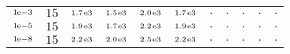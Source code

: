 \begin{tiny}
\begin{tabular}{@{$\;$}c@{$\;$}|@{$\;$}c@{$\;$}@{$\;$}c@{$\;$}@{$\;$}c@{$\;$}@{$\;$}c@{$\;$}@{$\;$}c@{$\;$}|@{$\;$}c@{$\;$}@{$\;$}c@{$\;$}@{$\;$}c@{$\;$}@{$\;$}c@{$\;$}@{$\;$}c@{$\;$}}
$\scriptstyle1\!\mathrm{\hspace{0.10em}e}-3$ & $\scriptstyle15$ & $\scriptstyle1.7\mathrm{\hspace{0.10em}e}3$ & $\scriptstyle1.5\mathrm{\hspace{0.10em}e}3$ & $\scriptstyle2.0\mathrm{\hspace{0.10em}e}3$ & $\scriptstyle1.7\mathrm{\hspace{0.10em}e}3$ & $\scriptstyle.$ & $\scriptstyle.$ & $\scriptstyle.$ & $\scriptstyle.$ & $\scriptstyle.$\\ 
$\scriptstyle1\!\mathrm{\hspace{0.10em}e}-5$ & $\scriptstyle15$ & $\scriptstyle1.9\mathrm{\hspace{0.10em}e}3$ & $\scriptstyle1.7\mathrm{\hspace{0.10em}e}3$ & $\scriptstyle2.2\mathrm{\hspace{0.10em}e}3$ & $\scriptstyle1.9\mathrm{\hspace{0.10em}e}3$ & $\scriptstyle.$ & $\scriptstyle.$ & $\scriptstyle.$ & $\scriptstyle.$ & $\scriptstyle.$\\ 
$\scriptstyle1\!\mathrm{\hspace{0.10em}e}-8$ & $\scriptstyle15$ & $\scriptstyle2.2\mathrm{\hspace{0.10em}e}3$ & $\scriptstyle2.0\mathrm{\hspace{0.10em}e}3$ & $\scriptstyle2.5\mathrm{\hspace{0.10em}e}3$ & $\scriptstyle2.2\mathrm{\hspace{0.10em}e}3$ & $\scriptstyle.$ & $\scriptstyle.$ & $\scriptstyle.$ & $\scriptstyle.$ & $\scriptstyle.$\\ 
\end{tabular} 
\end{tiny} 
